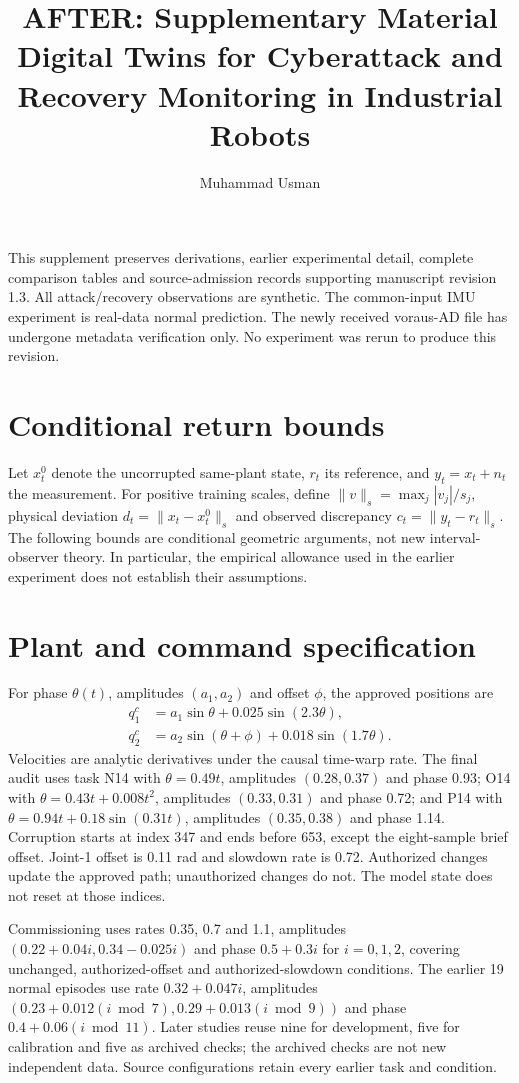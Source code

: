 \documentclass[11pt]{article}
\title{AFTER: Supplementary Material\\\large Digital Twins for Cyberattack and Recovery Monitoring in Industrial Robots}
\author{Muhammad Usman}
\date{}
\begin{document}
\maketitle
This supplement preserves derivations, earlier experimental detail, complete comparison tables and source-admission records supporting manuscript revision 1.3. All attack/recovery observations are synthetic. The common-input IMU experiment is real-data normal prediction. The newly received voraus-AD file has undergone metadata verification only. No experiment was rerun to produce this revision.

\section{Conditional return bounds}
Let $x_t^0$ denote the uncorrupted same-plant state, $r_t$ its reference, and $y_t=x_t+n_t$ the measurement. For positive training scales, define $\|v\|_s=\max_j|v_j|/s_j$, physical deviation $d_t=\|x_t-x_t^0\|_s$ and observed discrepancy $c_t=\|y_t-r_t\|_s$. The following bounds are conditional geometric arguments, not new interval-observer theory. In particular, the empirical allowance used in the earlier experiment does not establish their assumptions.


\section{Plant and command specification}\label{sec:simulation}

For phase $\theta(t)$, amplitudes $(a_1,a_2)$ and offset $\phi$, the approved positions are
\begin{align}
q_1^c&=a_1\sin\theta+0.025\sin(2.3\theta),\\
q_2^c&=a_2\sin(\theta+\phi)+0.018\sin(1.7\theta).
\end{align}
Velocities are analytic derivatives under the causal time-warp rate. The final audit uses task N14 with $\theta=0.49t$, amplitudes $(0.28,0.37)$ and phase 0.93; O14 with $\theta=0.43t+0.008t^2$, amplitudes $(0.33,0.31)$ and phase 0.72; and P14 with $\theta=0.94t+0.18\sin(0.31t)$, amplitudes $(0.35,0.38)$ and phase 1.14. Corruption starts at index 347 and ends before 653, except the eight-sample brief offset. Joint-1 offset is 0.11 rad and slowdown rate is 0.72. Authorized changes update the approved path; unauthorized changes do not. The model state does not reset at those indices.

Commissioning uses rates 0.35, 0.7 and 1.1, amplitudes $(0.22+0.04i,0.34-0.025i)$ and phase $0.5+0.3i$ for $i=0,1,2$, covering unchanged, authorized-offset and authorized-slowdown conditions. The earlier 19 normal episodes use rate $0.32+0.047i$, amplitudes $(0.23+0.012(i\bmod7),0.29+0.013(i\bmod9))$ and phase $0.4+0.06(i\bmod11)$. Later studies reuse nine for development, five for calibration and five as archived checks; the archived checks are not new independent data. Source configurations retain every earlier task and condition.
\end{document}
